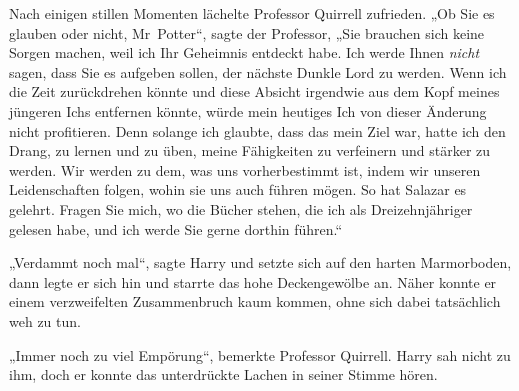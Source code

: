 Nach einigen stillen Momenten lächelte Professor Quirrell zufrieden. „Ob Sie es glauben oder nicht, Mr~Potter“, sagte der Professor, „Sie brauchen sich keine Sorgen machen, weil ich Ihr Geheimnis entdeckt habe. Ich werde Ihnen \emph{nicht} sagen, dass Sie es aufgeben sollen, der nächste Dunkle Lord zu werden. Wenn ich die Zeit zurückdrehen könnte und diese Absicht irgendwie aus dem Kopf meines jüngeren Ichs entfernen könnte, würde mein heutiges Ich von dieser Änderung nicht profitieren. Denn solange ich glaubte, dass das mein Ziel war, hatte ich den Drang, zu lernen und zu üben, meine Fähigkeiten zu verfeinern und stärker zu werden. Wir werden zu dem, was uns vorherbestimmt ist, indem wir unseren Leidenschaften folgen, wohin sie uns auch führen mögen. So hat Salazar es gelehrt. Fragen Sie mich, wo die Bücher stehen, die ich als Dreizehnjähriger gelesen habe, und ich werde Sie gerne dorthin führen.“

„Verdammt noch mal“, sagte Harry und setzte sich auf den harten Marmorboden, dann legte er sich hin und starrte das hohe Deckengewölbe an. Näher konnte er einem verzweifelten Zusammenbruch kaum kommen, ohne sich dabei tatsächlich weh zu tun.

„Immer noch zu viel Empörung“, bemerkte Professor Quirrell. Harry sah nicht zu ihm, doch er konnte das unterdrückte Lachen in seiner Stimme hören.

